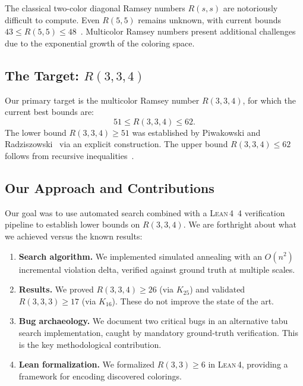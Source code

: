 \documentclass[11pt,a4paper]{article}
\theoremstyle{definition}
\theoremstyle{remark}
\newcommand{\lean}{\textsc{Lean\,4}}
\begin{document}
The classical two-color diagonal Ramsey numbers $R(s,s)$ are notoriously
difficult to compute.  Even $R(5,5)$ remains unknown, with current
bounds $43 \le R(5,5) \le 48$~\cite{Radziszowski2024}.
Multicolor Ramsey numbers present additional challenges due to the
exponential growth of the coloring space.

\subsection{The Target: $R(3,3,4)$}

Our primary target is the multicolor Ramsey number $R(3,3,4)$, for which
the current best bounds are:
\begin{equation}\label{eq:known-bounds}
  51 \le R(3,3,4) \le 62.
\end{equation}
The lower bound $R(3,3,4) \ge 51$ was established by Piwakowski and
Radziszowski~\cite{Piwakowski2000} via an explicit construction.
The upper bound $R(3,3,4) \le 62$ follows from recursive
inequalities~\cite{Radziszowski2024}.

\subsection{Our Approach and Contributions}

Our goal was to use automated search combined with a \lean{}~4
verification pipeline to establish lower bounds on $R(3,3,4)$.
We are forthright about what we achieved versus the known results:

\begin{enumerate}
  \item \textbf{Search algorithm.}
        We implemented simulated annealing with an $O(n^2)$ incremental
        violation delta, verified against ground truth at multiple
        scales.
  \item \textbf{Results.}
        We proved $R(3,3,4) \ge 26$ (via $K_{25}$) and validated
        $R(3,3,3) \ge 17$ (via $K_{16}$).
        These do not improve the state of the art.
  \item \textbf{Bug archaeology.}
        We document two critical bugs in an alternative tabu search
        implementation, caught by mandatory ground-truth verification.
        This is the key methodological contribution.
  \item \textbf{Lean formalization.}
        We formalized $R(3,3) \ge 6$ in \lean{}, providing a
        framework for encoding discovered colorings.
\end{enumerate}
\end{document}

